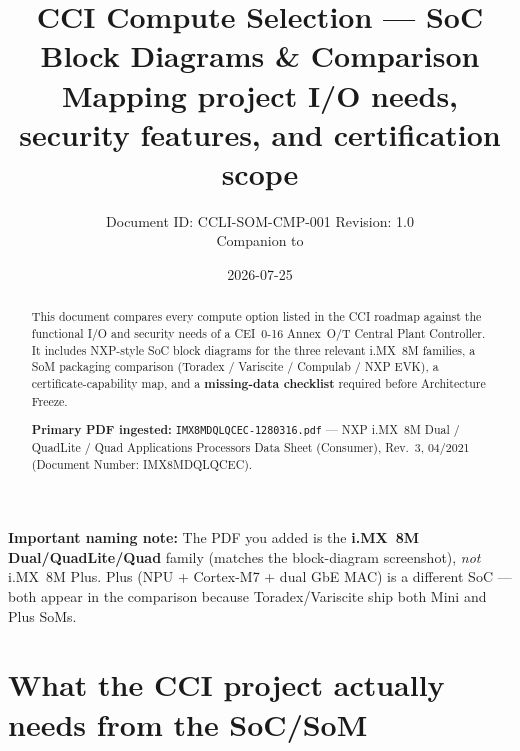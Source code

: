 \documentclass[10pt,a4paper]{article}
\title{%
  \textbf{CCI Compute Selection --- SoC Block Diagrams \& Comparison}\\[0.35em]
  \large Mapping project I/O needs, security features, and certification scope
}
\author{Document ID: CCLI-SOM-CMP-001 \quad Revision: 1.0\\
Companion to \docref{CCLI-ROADMAP-001}}
\date{2026-07-25}
\newcommand{\file}[1]{\texttt{#1}}
\begin{document}
\maketitle
\thispagestyle{empty}

\begin{abstract}
\noindent
This document compares every compute option listed in the CCI roadmap against the functional I/O and security needs of a CEI~0-16 Annex~O/T Central Plant Controller.
It includes NXP-style SoC block diagrams for the three relevant i.MX~8M families, a SoM packaging comparison (Toradex / Variscite / Compulab / NXP EVK), a certificate-capability map, and a \textbf{missing-data checklist} required before Architecture Freeze.

\textbf{Primary PDF ingested:} \file{IMX8MDQLQCEC-1280316.pdf} --- NXP i.MX~8M Dual / QuadLite / Quad Applications Processors Data Sheet (Consumer), Rev.~3, 04/2021 (Document Number: IMX8MDQLQCEC).
\end{abstract}

\begin{center}
\begin{minipage}{0.95\linewidth}
\colorbox{warnbg}{%
  \parbox{\dimexpr\linewidth-2\fboxsep\relax}{%
    \small
    \textbf{\textcolor{warnA}{Important naming note:}}
    The PDF you added is the \textbf{i.MX~8M Dual/QuadLite/Quad} family (matches the block-diagram screenshot), \emph{not} i.MX~8M Plus.
    Plus (NPU + Cortex-M7 + dual GbE MAC) is a different SoC --- both appear in the comparison because Toradex/Variscite ship both Mini and Plus SoMs.
  }%
}
\end{minipage}
\end{center}

\tableofcontents
\newpage

\section{What the CCI project actually needs from the SoC/SoM}
\label{sec:needs}
\end{document}
